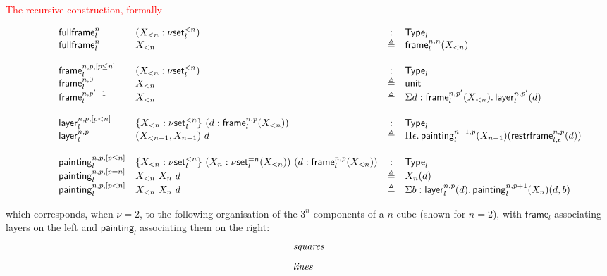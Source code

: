 \documentclass[12pt,landscape]{article}
\newcommand{\sort}[1]{\mathsf{Type}_{#1}}
\newcommand{\defeq}{\triangleq}
\newcommand{\partialcubset}[2]{\mathsf{\nu set}_{#1}^{<#2}}
\newcommand{\mycubsetcomp}[2]{\mathsf{\nu set}_{#1}^{=#2}}
\newcommand{\mybox}[1]{\mathsf{frame}_{#1}}
\newcommand{\mylayer}[1]{\mathsf{layer}_{#1}}
\newcommand{\mycube}[1]{\mathsf{painting}_{#1}}
\newcommand{\myfullbox}[1]{\mathsf{fullframe}_{#1}}
\newcommand{\unittype}{\mathsf{unit}}
\newcommand{\downbox}[2]{\mathsf{restrframe}_{#1,#2}}
\begin{document}
\begin{Large}
\begin{sf}
\begin{center}
\textcolor{red}{\huge The recursive construction, formally}
\end{center}
\vspace{-1mm}
\begin{large}
$$
\hspace{8mm}
\begin{array}{llcl}
\myfullbox{l}^{n} & (X_{<n}:\partialcubset{l}{n}) & : & \sort{l}\\
\myfullbox{l}^{n} & X_{<n} & \defeq & \mybox{l}^{n,n}(X_{<n})\\
\\
\mybox{l}^{n,p,[p \leq n]} & (X_{<n}:\partialcubset{l}{n}) & : & \sort{l}\\
\mybox{l}^{n,0} & X_{<n} & \defeq & \unittype\\
\mybox{l}^{n,p'+1} & X_{<n} & \defeq & \Sigma d:\mybox{l}^{n,p'}(X_{<n}).\,\mylayer{l}^{n,p'}(d)\\
\\
\mylayer{l}^{n,p,[p < n]} & \!\!\!\begin{array}{l}\{X_{<n}:\partialcubset{l}{n}\}~(d:\mybox{l}^{n,p}(X_{<n}))\end{array}& : & \sort{l}\\
\mylayer{l}^{n,p} & (X_{<n-1},X_{n-1})~d & \defeq & \Pi \epsilon.\,\mycube{l}^{n-1,p}(X_{n-1})(\downbox{l}{\epsilon}^{n,p}(d))\\
\\
\mycube{l}^{n,p,[p \leq n]} & \!\!\!\begin{array}{l}\{X_{<n}:\partialcubset{l}{n}\}~(X_n:\mycubsetcomp{l}{n}(X_{<n}))~(d:\mybox{l}^{n,p}(X_{<n}))\end{array}\!\!\! & : & \sort{l}\\
\mycube{l}^{n,p,[p = n]} & X_{<n}~X_n~d & \defeq & X_n(d)\\
\mycube{l}^{n,p,[p < n]} & X_{<n}~X_n~d & \defeq & \Sigma b:\mylayer{l}^{n,p}(d).\,\mycube{l}^{n,p+1}(X_n)(d,b)\\
\end{array}
$$
\end{large}
\noindent which corresponds, when $\nu=2$, to
the following organisation of the $3^n$ components of a $n$-cube (shown for $n=2$), with
$\mybox{l}$ associating layers on the left and $\mycube{l}$ associating them
on the right:
$$
\begin{array}{l}
\begin{array}{lll}
\mbox{\textit{squares}}\\
[3mm]\mbox{\textit{lines}}\\

\end{array}
\end{array}$$
\end{sf}
\end{Large}
\end{document}
